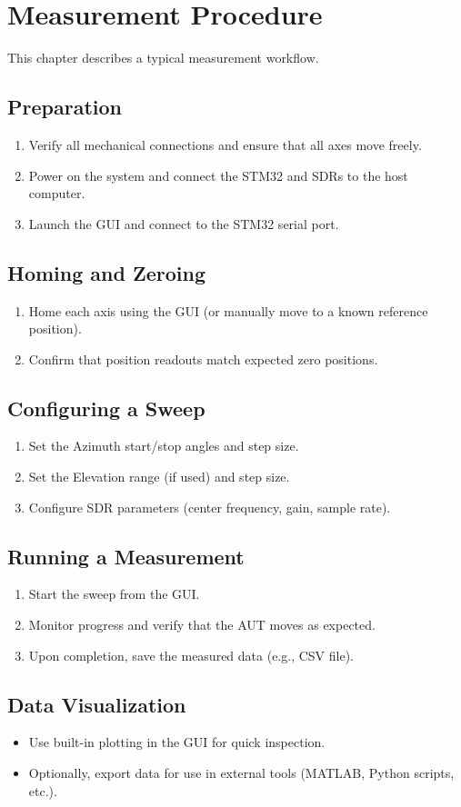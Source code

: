 \chapter{Measurement Procedure}

This chapter describes a typical measurement workflow.

\section{Preparation}

\begin{enumerate}
  \item Verify all mechanical connections and ensure that all axes move freely.
  \item Power on the system and connect the STM32 and SDRs to the host computer.
  \item Launch the GUI and connect to the STM32 serial port.
\end{enumerate}

\section{Homing and Zeroing}

\begin{enumerate}
  \item Home each axis using the GUI (or manually move to a known reference position).
  \item Confirm that position readouts match expected zero positions.
\end{enumerate}

\section{Configuring a Sweep}

\begin{enumerate}
  \item Set the Azimuth start/stop angles and step size.
  \item Set the Elevation range (if used) and step size.
  \item Configure SDR parameters (center frequency, gain, sample rate).
\end{enumerate}

\section{Running a Measurement}

\begin{enumerate}
  \item Start the sweep from the GUI.
  \item Monitor progress and verify that the AUT moves as expected.
  \item Upon completion, save the measured data (e.g., CSV file).
\end{enumerate}

\section{Data Visualization}

\begin{itemize}
  \item Use built-in plotting in the GUI for quick inspection.
  \item Optionally, export data for use in external tools (MATLAB, Python scripts, etc.).
\end{itemize}
